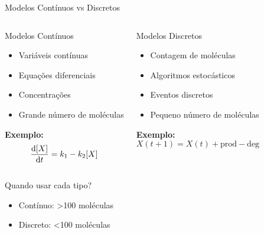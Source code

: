 \begin{frame}[shrink=10]{Modelos Contínuos vs Discretos}
\begin{columns}
\begin{block}{Modelos Contínuos}
\begin{itemize}
    \item Variáveis contínuas
    \item Equações diferenciais
    \item Concentrações
    \item Grande número de moléculas
\end{itemize}

\textbf{Exemplo:}
\begin{equation*}
\frac{\mathrm{d} [X]}{\mathrm{d} t} = k_1 - k_2[X]
\end{equation*}
\end{block}

\begin{block}{Modelos Discretos}
\begin{itemize}
    \item Contagem de moléculas
    \item Algoritmos estocásticos
    \item Eventos discretos
    \item Pequeno número de moléculas
\end{itemize}

\textbf{Exemplo:}
\begin{equation*}
X(t+1) = X(t) + \text{prod} - \text{deg}
\end{equation*}
\end{block}
\end{columns}


\begin{exampleblock}{Quando usar cada tipo?}
\begin{itemize}
    \item Contínuo: \textgreater 100 moléculas
    \item Discreto: \textless 100 moléculas
\end{itemize}
\end{exampleblock}
\end{frame}

